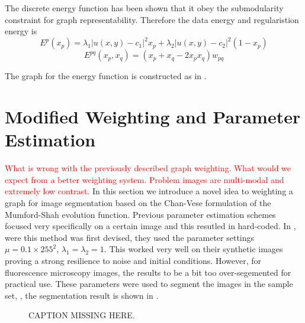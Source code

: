 \begin{definition} The discrete energy function  has been shown that it obey the submodularity constraint for graph representability. Therefore the data energy and regularistion energy is
	\begin{equation}
		E^p(x_p) = \lambda_1 |u(x,y)-c_1|^2 x_p + \lambda_2 |u(x,y)-c_2|^2 (1-x_p)
	\end{equation}
	\begin{equation}
	E^{pq}(x_p,x_q) = (x_p + x_q - 2x_px_q)w_{pq}
	\end{equation}
\end{definition}
The graph for the energy function is constructed as in \citep{Kolmogorov2004}.

\section{Modified Weighting and Parameter Estimation}
\label{sec:cvgc_weightingandparameterestimation}

\textcolor{red}{What is wrong with the previously described graph weighting. What would we expect from a better weighting system. Problem images are multi-modal and extremely low contrast.}
In this section we introduce a novel idea to weighting  a graph for image segmentation based on the Chan-Vese formulation of the Mumford-Shah evolution function. Previous parameter estimation schemes focused very specifically on a certain image and this resutled in hard-coded. In \citep{ElZehiry2007}, were this method was first devised, they used the parameter settings $\mu = 0.1 \times 255^2$, $\lambda_1 = \lambda_2 = 1$. This worked very well on their synthetic images proving a strong resilience to noise and initial conditions. However, for fluorescence microscopy images, the results to be a bit too over-segemented for practical use. These parameters were used to segment the images in the sample set, , the segmentation result is shown in .

\begin{figure}[!h]
	\centering
	\caption{CAPTION MISSING HERE.}
	\label{fig:samplesetdefaultcv}
\end{figure}

